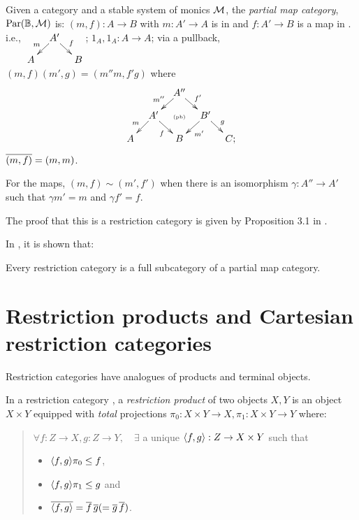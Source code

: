 Given a category \B and a stable system of monics $\mathcal{M}$, the \emph{partial map category},
$\text{Par}(\mathbb{B},\mathcal{M})$ is:
    {$(m,f):A\to B$  with $m:A' \to A$ is in \Mstab and $f:A' \to B$ is a map in \B. i.e.,
      $\xymatrix @R-15pt @C-15pt{&A'\ar[dl]_{m} \ar[dr]^{f}\\A&&B}$;}
    {$1_A,1_A:A \to A$;}
    {via a pullback, $(m,f)(m',g) = (m'' m, f' g)$ where
      \[
        \xymatrix @C-15pt @R-15pt{
          &&A''\ar[dl]_{m''}\ar[dr]^{f'}\\
          &A'\ar[dl]_{m}\ar[dr]_{f}&\text{{\tiny (pb)}}&B'\ar[dl]^{m'}\ar[dr]^{g}\\
          A&&B&&C;
        }
      \]
    }
    {$\overline{(m,f)} = (m,m)$.}

For the maps, $(m,f) \sim (m',f')$ when there is an isomorphism $\gamma : A'' \to A'$
such that $\gamma m' = m$ and $\gamma f' = f$.

The proof that this is a restriction category is given by Proposition 3.1 in
\cite{cockett2002:restcategories1}.

In \cite{cockettlack2003:restcategories2}, it is shown that:
\begin{theorem}
  Every restriction category is a full subcategory of a partial map category.
\end{theorem}
\section{Restriction products and Cartesian restriction categories} %
\label{sub:restriction_products_and_cartesian_restriction_categories}


Restriction categories have analogues of products and terminal objects.

\begin{definition}\label{def:restriction_product}
  In a restriction category \X, a \emph{restriction product}  of two objects $X, Y$ is an
  object $X\times Y$ equipped with \emph{total} projections
  $\pi_0:X\times Y\to X, \pi_1:X\times Y\to Y $ where:
  \begin{quote}
    $\forall f:Z\to X, g: Z\to Y, \quad \exists$ a unique $\langle f,g\rangle:Z \to X\times Y$ such that
    \begin{itemize}
      \item $\langle f,g\rangle \pi_0 \le f$,
      \item $\langle f,g\rangle \pi_1 \le g$ and
      \item $\overline{\langle f,g\rangle} = \overline{f}\, \overline{g} ( = \overline{g}\, \overline{f})$.
    \end{itemize}
  \end{quote}
\end{definition}

